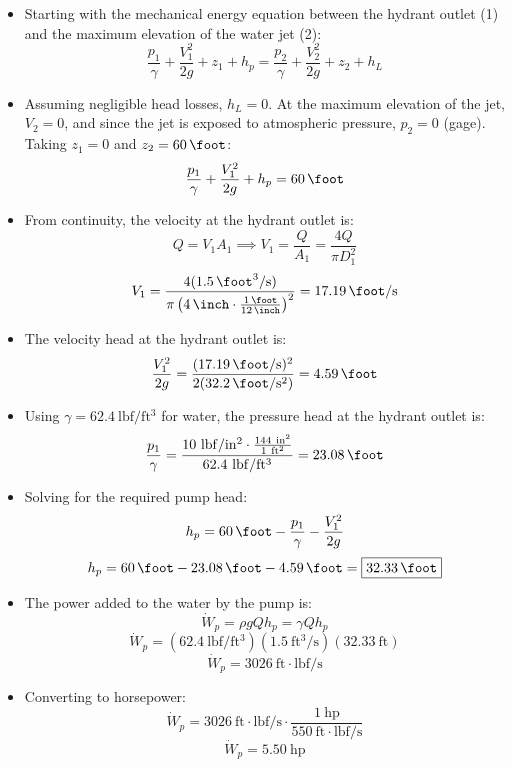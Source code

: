 ﻿\documentclass[12pt]{article}
\begin{document}
\begin{itemize}
    \item Starting with the mechanical energy equation between the hydrant outlet (1) and the maximum elevation of the water jet (2):
    \[\frac{p_1}{\gamma}+\frac{V_1^2}{2g}+z_1+h_p=\frac{p_2}{\gamma}+\frac{V_2^2}{2g}+z_2+h_L\]
    \item Assuming negligible head losses, $h_L=0$. At the maximum elevation of the jet, $V_2=0$, and since the jet is exposed to atmospheric pressure, $p_2=0$ (gage). Taking $z_1=0$ and $z_2=\SI{60}{\foot}$:
    \[\frac{p_1}{\gamma}+\frac{V_1^2}{2g}+h_p=\SI{60}{\foot}\]
    \item From continuity, the velocity at the hydrant outlet is:
    \[Q=V_1A_1\implies V_1=\frac{Q}{A_1}=\frac{4Q}{\pi D_1^2}\]
    \[V_1=\frac{4(\SI{1.5}{\foot\cubed\per\second})}{\pi\left(\SI{4}{\inch}\cdot\frac{\SI{1}{\foot}}{\SI{12}{\inch}}\right)^2}=\SI{17.19}{\foot\per\second}\]
    \item The velocity head at the hydrant outlet is:
    \[\frac{V_1^2}{2g}=\frac{(\SI{17.19}{\foot\per\second})^2}{2(\SI{32.2}{\foot\per\second\squared})}=\SI{4.59}{\foot}\]
    \item Using $\gamma=62.4\ \mathrm{lbf/ft^3}$ for water, the pressure head at the hydrant outlet is:
    \[\frac{p_1}{\gamma}=\frac{10\ \mathrm{lbf/in^2}\cdot\frac{144\ \mathrm{in^2}}{1\ \mathrm{ft^2}}}{62.4\ \mathrm{lbf/ft^3}}=\SI{23.08}{\foot}\]
    \item Solving for the required pump head:
    \[h_p=\SI{60}{\foot}-\frac{p_1}{\gamma}-\frac{V_1^2}{2g}\]
    \[h_p=\SI{60}{\foot}-\SI{23.08}{\foot}-\SI{4.59}{\foot}=\boxed{\SI{32.33}{\foot}}\]
    \item The power added to the water by the pump is:
    \[\dot{W}_p=\rho gQh_p=\gamma Qh_p\]
    \[\dot{W}_p=(62.4\ \mathrm{lbf/ft^3})(1.5\ \mathrm{ft^3/s})(32.33\ \mathrm{ft})\]
    \[\dot{W}_p=3026\ \mathrm{ft\cdot lbf/s}\]
    \item Converting to horsepower:
    \[\dot{W}_p=3026\ \mathrm{ft\cdot lbf/s}\cdot\frac{1\ \mathrm{hp}}{550\ \mathrm{ft\cdot lbf/s}}\]
    \[\boxed{\dot{W}_p=\SI{5.50}{\mathrm{hp}}}\]
\end{itemize}

\end{document}
